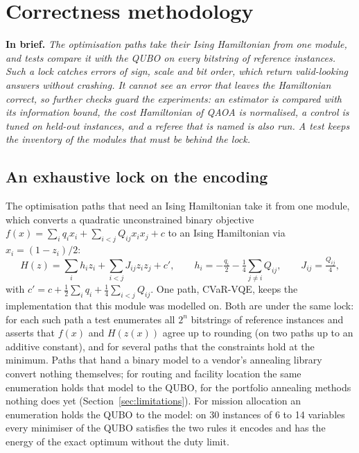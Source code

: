 \documentclass[11pt,a4paper]{article}
\newcommand{\inbrief}[1]{\par\smallskip\noindent\textbf{In brief.} \emph{#1}\par\medskip}
\begin{document}
\section{Correctness methodology}
\label{sec:correctness}

\inbrief{The optimisation paths take their Ising Hamiltonian from one
module, and tests compare it with the QUBO on every bitstring of reference
instances. Such a lock catches errors of sign, scale and bit order, which
return valid-looking answers without crashing. It cannot see an error that
leaves the Hamiltonian correct, so further checks guard the experiments: an
estimator is compared with its information bound, the cost Hamiltonian of
QAOA is normalised, a control is tuned on held-out instances, and a referee
that is named is also run. A test keeps the inventory of the modules that
must be behind the lock.}

\subsection{An exhaustive lock on the encoding}

The optimisation paths that need an Ising Hamiltonian take it from one
module, which converts a
quadratic unconstrained binary objective
$f(x) = \sum_i q_i x_i + \sum_{i<j} Q_{ij} x_i x_j + c$ to an Ising
Hamiltonian via $x_i = (1 - z_i)/2$:
\begin{equation}
H(z) = \sum_i h_i z_i + \sum_{i<j} J_{ij} z_i z_j + c', \qquad
h_i = -\tfrac{q_i}{2} - \tfrac{1}{4}\sum_{j\neq i} Q_{ij}, \qquad
J_{ij} = \tfrac{Q_{ij}}{4},
\end{equation}
with $c' = c + \tfrac{1}{2}\sum_i q_i + \tfrac{1}{4}\sum_{i<j} Q_{ij}$.
One path, CVaR-VQE, keeps the implementation that this module was modelled
on. Both are under the same lock: for each such path a test enumerates all
$2^n$ bitstrings of reference instances and asserts that $f(x)$ and
$H(z(x))$ agree up to rounding (on two paths up to an additive constant),
and for several paths that the constraints hold at the minimum. Paths that
hand a binary model to a vendor's annealing library convert nothing
themselves; for routing and facility location the same enumeration holds
that model to the QUBO, for the portfolio annealing methods nothing does yet
(Section~\ref{sec:limitations}). For mission allocation an enumeration
holds the QUBO to the model: on 30 instances of 6 to 14 variables every
minimiser of the QUBO satisfies the two rules it encodes and has the energy
of the exact optimum without the duty limit.
\end{document}
